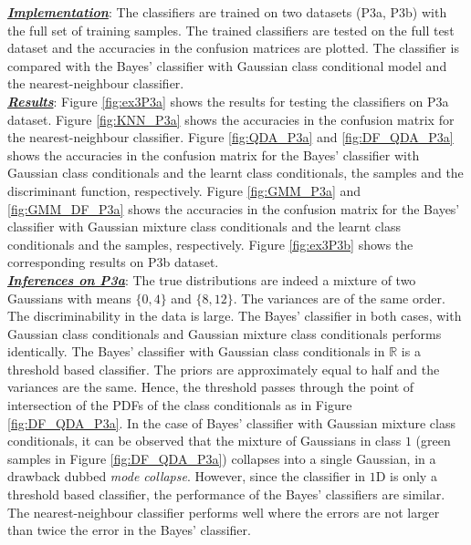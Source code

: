 \documentclass[12pt, a4 paper]{article}
\newcommand{\rr}{\mathbb{R}}
\begin{document}
\underline {\it \bfseries Implementation}: The classifiers are trained on two datasets (P3a, P3b) with the full set of training samples. The trained classifiers are tested on the full test dataset and the accuracies in the confusion matrices are plotted. The classifier is compared with the Bayes' classifier with Gaussian class conditional model and the nearest-neighbour classifier. \\

\underline {\it \bfseries Results}: Figure \ref{fig:ex3P3a} shows the results for testing the classifiers on P3a dataset. Figure \ref{fig:KNN_P3a} shows the accuracies in the confusion matrix for the nearest-neighbour classifier. Figure \ref{fig:QDA_P3a} and \ref{fig:DF_QDA_P3a} shows the accuracies in the confusion matrix for the Bayes' classifier with Gaussian class conditionals and the learnt class conditionals, the samples and the discriminant function, respectively. Figure \ref{fig:GMM_P3a} and \ref{fig:GMM_DF_P3a} shows the accuracies in the confusion matrix for the Bayes' classifier with Gaussian mixture class conditionals and the learnt class conditionals and the samples, respectively. Figure \ref{fig:ex3P3b} shows the corresponding results on P3b dataset. \\

\underline {\it \bfseries Inferences on P3a}: The true distributions are indeed a mixture of two Gaussians with means $\{0,4\}$ and $\{8,12\}$. The variances are of the same order. The discriminability in the data is large. The Bayes' classifier in both cases, with Gaussian class conditionals and Gaussian mixture class conditionals performs identically. The Bayes' classifier with Gaussian class conditionals in $\rr$ is a threshold based classifier. The priors are approximately equal to half and the variances are the same. Hence, the threshold passes through the point of intersection of the PDFs of the class conditionals as in Figure \ref{fig:DF_QDA_P3a}. In the case of Bayes' classifier with Gaussian mixture class conditionals, it can be observed that the mixture of Gaussians in class $1$ (green samples in Figure \ref{fig:DF_QDA_P3a}) collapses into a single Gaussian, in a drawback dubbed {\it mode collapse}. However, since the classifier in $1$D is only a threshold based classifier, the performance of the Bayes' classifiers are similar. The nearest-neighbour classifier performs well where the errors are not larger than twice the error in the Bayes' classifier. \\
\end{document}
